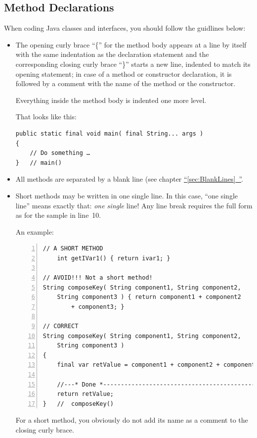 \documentclass[11pt,a4paper, titlepage, parskip=half, headsepline, footsepline, cleardoublepage=current, headheight=1cm]{scrbook}
\newcommand*{\tqfullref}[1]{\hyperref[{#1}]{“\ref*{#1}~\nameref*{#1}”}}
\begin{document}
\subsection{Method Declarations}
When coding Java classes and interfaces, you should follow the guidlines below:
\begin{itemize}
\item{The opening curly brace “\{” for the method body appears at a line by itself with the same indentation as the declaration statement and the corresponding closing curly brace “\}” starts a new line, indented to match its opening statement; in case of a method or constructor declaration, it is followed by a comment with the name of the method or the constructor.

Everything inside the method body is indented one more level.

That looks like this:
\begin{lstlisting}
public static final void main( final String... args ) 
{
    // Do something …
}   // main()
\end{lstlisting}}

\item{All methods are separated by a blank line (see chapter \tqfullref{sec:BlankLines}.}

\item{Short methods may be written in one single line. In this case, “one single line” means exactly that: \textit{one single} line! Any line break requires the full form as for the sample in line~10.

An example:
\begin{lstlisting}[numbers=left]
// A SHORT METHOD
    int getIVar1() { return ivar1; }
    
// AVOID!!! Not a short method!
String composeKey( String component1, String component2,
    String component3 ) { return component1 + component2 
        + component3; }
        
// CORRECT
String composeKey( String component1, String component2, 
    String component3 )
{
    final var retValue = component1 + component2 + component3;
    
    //---* Done *----------------------------------------------------
    return retValue;
}   //  composeKey()
\end{lstlisting}

For a short method, you obviously do not add its name as a comment to the closing curly brace.}
\end{itemize}
\end{document}
